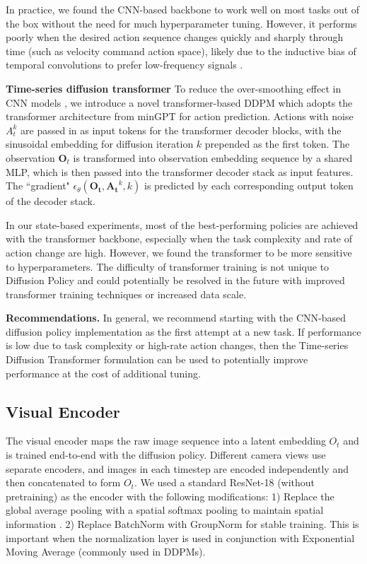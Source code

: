 In practice, we found the CNN-based backbone to work well on most tasks out of the box without the need for much hyperparameter tuning. However, it performs poorly when the desired action sequence changes quickly and sharply through time (such as velocity command action space), likely due to the inductive bias of temporal convolutions to prefer low-frequency signals \cite{tancik2020fourier}. 

\textbf{Time-series diffusion transformer}
To reduce the over-smoothing effect in CNN models \cite{tancik2020fourier}, we introduce a novel transformer-based DDPM which adopts the transformer architecture from minGPT \cite{bet} for action prediction. 
Actions with noise $A_t^k$ are passed in as input tokens for the transformer decoder blocks, with the sinusoidal embedding for diffusion iteration $k$ prepended as the first token. 
The observation $\mathbf{O}_t$ is transformed into observation embedding sequence by a shared MLP, which is then passed into the transformer decoder stack as input features.
The ``gradient" $\epsilon_\theta(\mathbf{O_t},\mathbf{A_t}^k,k)$ is predicted by each corresponding output token of the decoder stack. 

In our state-based experiments, most of the best-performing policies are achieved with the transformer backbone, especially when the task complexity and rate of action change are high. However, we found the transformer to be more sensitive to hyperparameters. The difficulty of transformer training \cite{liu2020understanding} is not unique to Diffusion Policy and could potentially be resolved in the future with improved transformer training techniques or increased data scale.

\textbf{Recommendations.} 
 In general, we recommend starting with the CNN-based diffusion policy implementation as the first attempt at a new task. If performance is low due to task complexity or high-rate action changes, then the Time-series Diffusion Transformer formulation can be used to potentially improve performance at the cost of additional tuning. 

\subsection{Visual Encoder}
\label{sec:method-visual}
The visual encoder  maps the raw image sequence into a latent embedding $O_t$ and is trained end-to-end with the diffusion policy. 
Different camera views use separate encoders, and images in each timestep are encoded independently and then concatenated to form $O_t$.  
We used a standard ResNet-18 (without pretraining) as the encoder with the following modifications: 
1) Replace the global average pooling with a spatial softmax pooling to maintain spatial information \cite{robomimic}. 
2) Replace BatchNorm with GroupNorm \cite{groupnorm} for stable training. This is important when the normalization layer is used in conjunction with Exponential Moving Average \cite{he2020moco} (commonly used in DDPMs). 

